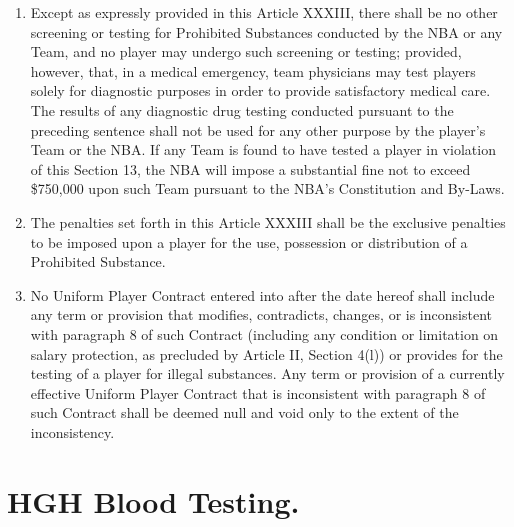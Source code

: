 \documentclass[
]{book}
\providecommand{\tightlist}{%
  \setlength{\itemsep}{0pt}\setlength{\parskip}{0pt}}
\begin{document}
\begin{enumerate}
\def\labelenumi{(\alph{enumi})}
\tightlist
\item
  Except as expressly provided in this Article XXXIII, there shall be no other screening or testing for Prohibited Substances conducted by the NBA or any Team, and no player may undergo such screening or testing; provided, however, that, in a medical emergency, team physicians may test players solely for diagnostic purposes in order to provide satisfactory medical care. The results of any diagnostic drug testing conducted pursuant to the preceding sentence shall not be used for any other purpose by the player's Team or the NBA. If any Team is found to have tested a player in violation of this Section 13, the NBA will impose a substantial fine not to exceed \$750,000 upon such Team pursuant to the NBA's Constitution and By-Laws.
\item
  The penalties set forth in this Article XXXIII shall be the exclusive penalties to be imposed upon a player for the use, possession or distribution of a Prohibited Substance.
\item
  No Uniform Player Contract entered into after the date hereof shall include any term or provision that modifies, contradicts, changes, or is inconsistent with paragraph 8 of such Contract (including any condition or limitation on salary protection, as precluded by Article II, Section 4(l)) or provides for the testing of a player for illegal substances. Any term or provision of a currently effective Uniform Player Contract that is inconsistent with paragraph 8 of such Contract shall be deemed null and void only to the extent of the inconsistency.
\end{enumerate}

\hypertarget{hgh-blood-testing.}{%
\section{HGH Blood Testing.}\label{hgh-blood-testing.}}
\end{document}
